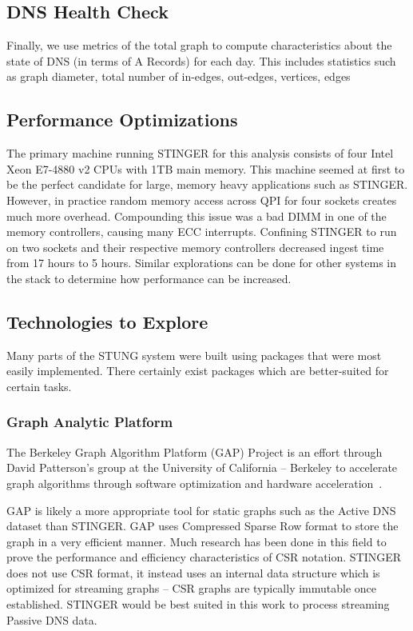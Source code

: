 \documentclass{acm_proc_article-sp}
\begin{document}
\subsection{DNS Health Check}
Finally, we use metrics of the total graph to compute characteristics about the state of DNS (in terms of A Records) for each day. This includes statistics such as graph diameter, total number of in-edges, out-edges, vertices, edges

\subsection{Performance Optimizations}
The primary machine running STINGER for this analysis consists of four Intel Xeon E7-4880 v2 CPUs with 1TB main memory. This machine seemed at first to be the perfect candidate for large, memory heavy applications such as STINGER. However, in practice random memory access across QPI for four sockets creates much more overhead. Compounding this issue was a bad DIMM in one of the memory controllers, causing many ECC interrupts. Confining STINGER to run on two sockets and their respective memory controllers decreased ingest time from 17 hours to 5 hours. Similar explorations can be done for other systems in the stack to determine how performance can be increased.

\subsection{Technologies to Explore}
Many parts of the STUNG system were built using packages that were most easily implemented. There certainly exist packages which are better-suited for certain tasks.

\subsubsection{Graph Analytic Platform}
The Berkeley Graph Algorithm Platform (GAP) Project is an effort through David Patterson's group at the University of California -- Berkeley to accelerate graph algorithms through software optimization and hardware acceleration~\cite{GAP}. 

GAP is likely a more appropriate tool for static graphs such as the Active DNS dataset than STINGER. GAP uses Compressed Sparse Row format to store the graph in a very efficient manner. Much research has been done in this field to prove the performance and efficiency characteristics of CSR notation. STINGER does not use CSR format, it instead uses an internal data structure which is optimized for streaming graphs -- CSR graphs are typically immutable once established. STINGER would be best suited in this work to process streaming Passive DNS data.
\end{document}
